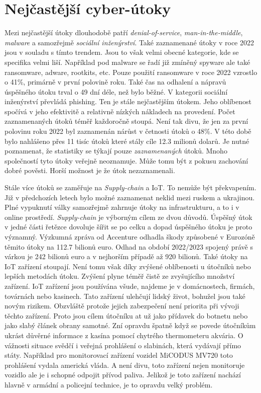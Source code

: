\section{Nejčastější cyber-útoky}
Mezi nejčastější útoky dlouhodobě patří \textit{denial-of-service}, \textit{man-in-the-middle}, \textit{malware} a samozřejmě \textit{sociální inženýrství}\cite{LI20218176}.
Také zaznamenané útoky v roce 2022 jsou v souladu s tímto trendem.
Jsou to však velmi obecné kategorie, kde se specifika velmi liší.
Například pod malware se řadí již zmíněný spyware ale také ransomware, adware, rootkits, etc.
Pouze použití ransomware v roce 2022 vzrostlo o 41\%, primárně v první polovině roku.
Také čas na odhalení a nápravů úspěšného útoku trval o 49 dní déle, než bylo běžné.
V kategorii sociální inženýrství převládá phishing.
Ten je stále nejčastějším útokem.
Jeho oblíbenost spočívá v jeho efektivitě a relativně nízkých nákladech na provedení.
Počet zaznamenaných útoků téměř každoročně stoupá\cite{moje_bakalarka}.
Není tak divu, že jen za první polovinu roku 2022 byl zaznamenán nárůst v četnosti útoků o 48\%.
V této době bylo nahlášeno přes 11 tisíc útoků které stály cíle 12.3 milionů dolarů.
Je nutné poznamenat, že statistiky se týkají pouze \textit{zaznamenaných} útoků.
Mnoho společností tyto útoky veřejně neoznamuje.
Může tomu být z pokusu zachování dobré pověsti.
Horší možnost je že útok nezaznamenali.\cite{securityintelligence_most_common_2022_attacks}

Stále více útoků se zaměřuje na \textit{Supply-chain} a \ac{IoT}.
To nemůže být překvapením.
Již v předchozích letech bylo možné zaznamenat neklid mezi ruskem a ukrajinou.
Plné vypuknutí války samozřejmě zahrnuje útoky na infrastrukturu, a to i v online prostředí.
\textit{Supply-chain} je výborným cílem ze dvou důvodů.
Úspěšný útok v jedné části řetězce dovoluje šířit se po celku a dopad úspěšného útoku je proto významný.
Výzkumná zpráva od Accenture\cite{accenture_supply-chain-disruption} odhadla škody způsobené v Eurozóně těmito útoky na 112.7 bilionů euro.
Odhad na období 2022/2023 spojený právě s várkou je 242 bilionů euro a v nejhorším případě až 920 bilionů.
Také útoky na \ac{IoT} zařízení stoupají.
Není tomu však díky zvýšené oblíbenosti u útočníků nebo lepších metodách útoku.
Zvýšení plyne téměř čistě ze zvyšujícího množství zařízení.
\ac{IoT} zařízení jsou používána všude, najdeme je v domácnostech, firmách, továrnách nebo kasinech.
Tato zařízení ulehčují lidský život, bohužel jsou také novým rizikem.
Obzvláště protože jejich zabezpečení není priorita při vývoji těchto zařízení.
Proto jsou cílem útočníku at už jako přídavek do botnetu nebo jako slabý článek obrany samotné.
Zní opravdu špatně když se povede útočníkům ukrást důvěrné informace z kasína pomocí chytrého thermometeru akvária\cite{casino_thermometer}.
O vážnosti situace svědčí i veřejná prohlášení o slabinách, která vydávají přímo státy.
Například pro monitorovací zařízení vozidel MiCODUS MV720 toto prohlášení vydala americká vláda\cite{america_gov_advisories_micodus}.
A není divu, toto zařízení nejen monitoruje vozidlo ale je i schopné odpojit přívod paliva.
Jelikož je toto zařízení nachází hlavně v armádní a policejní technice, je to opravdu velký problém.\cite{securityintelligence_most_common_2022_attacks}

